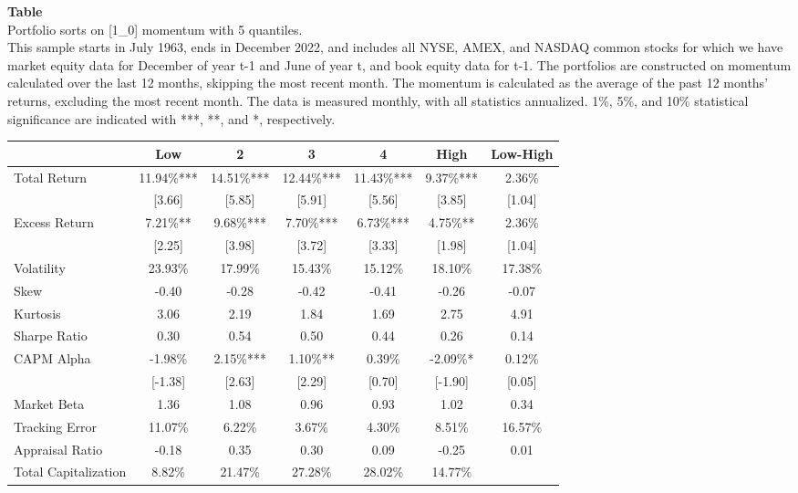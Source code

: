 \begin{table*}[ht!]
\raggedright
{}
\label{tab: quantile_sort_mom_[1_0]_with_5_quantiles}
\textbf{Table \thetable} \\
Portfolio sorts on [1\_0] momentum with 5 quantiles. \\
\hspace*{1em}This sample starts in July 1963, ends in December 2022, and includes all NYSE, AMEX, and NASDAQ common stocks for which we have market equity data for December of year t-1 and June of year t, and book equity data for t-1. The portfolios are constructed on momentum calculated over the last 12 months, skipping the most recent month. The momentum is calculated as the average of the past 12 months' returns, excluding the most recent month. The data is measured monthly, with all statistics annualized.  1\%, 5\%, and 10\% statistical significance are indicated with ***, **, and *, respectively. \\
\vspace{0.5em}
\centering
\begin{adjustbox}{max width=\textwidth}
\begin{tabular}{@{}lcccccc@{}}
\toprule
 & Low & 2 & 3 & 4 & High & Low-High \\
\midrule
Total Return & 11.94\%*** & 14.51\%*** & 12.44\%*** & 11.43\%*** & 9.37\%*** & 2.36\% \\
 & [3.66] & [5.85] & [5.91] & [5.56] & [3.85] & [1.04] \\
Excess Return & 7.21\%** & 9.68\%*** & 7.70\%*** & 6.73\%*** & 4.75\%** & 2.36\% \\
 & [2.25] & [3.98] & [3.72] & [3.33] & [1.98] & [1.04] \\
Volatility & 23.93\% & 17.99\% & 15.43\% & 15.12\% & 18.10\% & 17.38\% \\
Skew & -0.40 & -0.28 & -0.42 & -0.41 & -0.26 & -0.07 \\
Kurtosis & 3.06 & 2.19 & 1.84 & 1.69 & 2.75 & 4.91 \\
Sharpe Ratio & 0.30 & 0.54 & 0.50 & 0.44 & 0.26 & 0.14 \\
CAPM Alpha & -1.98\% & 2.15\%*** & 1.10\%** & 0.39\% & -2.09\%* & 0.12\% \\
 & [-1.38] & [2.63] & [2.29] & [0.70] & [-1.90] & [0.05] \\
Market Beta & 1.36 & 1.08 & 0.96 & 0.93 & 1.02 & 0.34 \\
Tracking Error & 11.07\% & 6.22\% & 3.67\% & 4.30\% & 8.51\% & 16.57\% \\
Appraisal Ratio & -0.18 & 0.35 & 0.30 & 0.09 & -0.25 & 0.01 \\
Total Capitalization & 8.82\% & 21.47\% & 27.28\% & 28.02\% & 14.77\% &  \\
\bottomrule
\end{tabular}
\end{adjustbox}
\end{table*}